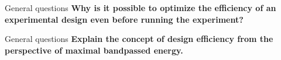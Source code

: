 \documentclass{beamer}
\begin{document}
\begin{frame}{General questions}
  \textbf{Why is it possible to optimize the efficiency of an experimental design even before running the experiment?}

%   
%   

\end{frame}

% 
%   
%   
% 



\begin{frame}{General questions}
  \textbf{Explain the concept of design efficiency from the perspective of maximal bandpassed energy.}

\end{frame}
\end{document}
